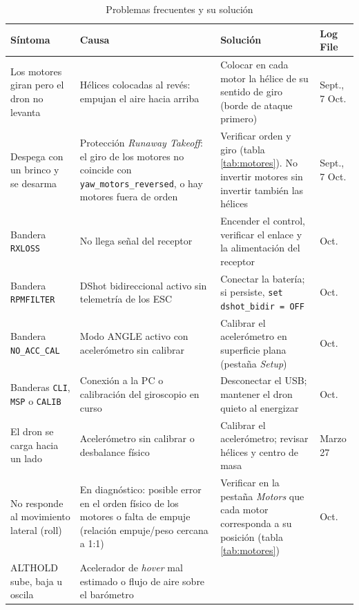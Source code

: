 \documentclass[pdflatex,sn-mathphys-num]{sn-jnl}%
\begin{document}
\begin{table}[!h]
\centering
\caption{Problemas frecuentes y su solución}
\label{tab:problemas}
\small
\begin{tabularx}{\textwidth}{@{}>{\raggedright\arraybackslash}p{3.2cm}>{\raggedright\arraybackslash}X>{\raggedright\arraybackslash}X>{\raggedright\arraybackslash}p{2.1cm}@{}}
\toprule
\textbf{Síntoma} & \textbf{Causa} & \textbf{Solución} & \textbf{Log File} \\
\midrule
Los motores giran pero el dron no levanta &
Hélices colocadas al revés: empujan el aire hacia arriba &
Colocar en cada motor la hélice de su sentido de giro (borde de ataque primero) &
Sept., 7 Oct. \\
\addlinespace
Despega con un brinco y se desarma &
Protección \textit{Runaway Takeoff}: el giro de los motores no coincide con \texttt{yaw\_motors\_reversed}, o hay motores fuera de orden &
Verificar orden y giro (tabla \ref{tab:motores}). No invertir motores sin invertir también las hélices &
Sept., 7 Oct. \\
\addlinespace
Bandera \texttt{RXLOSS} &
No llega señal del receptor &
Encender el control, verificar el enlace y la alimentación del receptor &
7 Oct. \\
\addlinespace
Bandera \texttt{RPMFILTER} &
DShot bidireccional activo sin telemetría de los ESC &
Conectar la batería; si persiste, \texttt{set dshot\_bidir = OFF} &
10 Oct. \\
\addlinespace
Bandera \texttt{NO\_ACC\_CAL} &
Modo ANGLE activo con acelerómetro sin calibrar &
Calibrar el acelerómetro en superficie plana (pestaña \textit{Setup}) &
13 Oct. \\
\addlinespace
Banderas \texttt{CLI}, \texttt{MSP} o \texttt{CALIB} &
Conexión a la PC o calibración del giroscopio en curso &
Desconectar el USB; mantener el dron quieto al energizar &
13 Oct. \\
\addlinespace
El dron se carga hacia un lado &
Acelerómetro sin calibrar o desbalance físico &
Calibrar el acelerómetro; revisar hélices y centro de masa &
Marzo 27 \\
\addlinespace
No responde al movimiento lateral (roll) &
En diagnóstico: posible error en el orden físico de los motores o falta de empuje (relación empuje/peso cercana a 1:1) &
Verificar en la pestaña \textit{Motors} que cada motor corresponda a su posición (tabla \ref{tab:motores}) &
23 Oct. \\
\addlinespace
ALTHOLD sube, baja u oscila &
Acelerador de \textit{hover} mal estimado o flujo de aire sobre el barómetro &

\end{tabularx}
\end{table}
\end{document}
